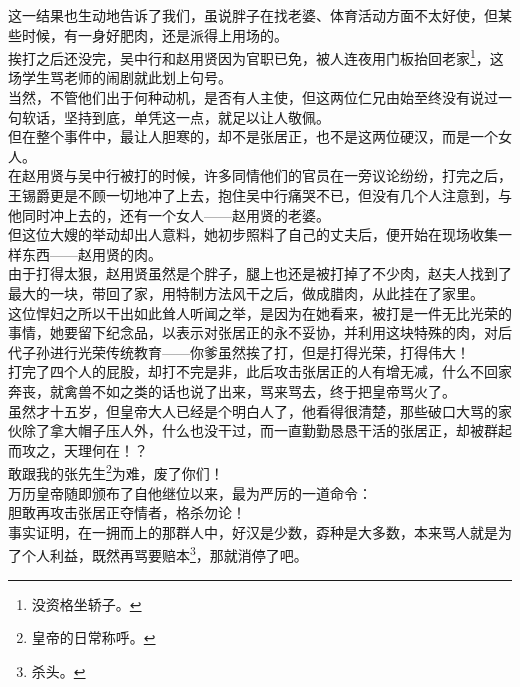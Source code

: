 \begin{multicols}{\theparacolNo}
这一结果也生动地告诉了我们，虽说胖子在找老婆、体育活动方面不太好使，但某些时候，有一身好肥肉，还是派得上用场的。\\

挨打之后还没完，吴中行和赵用贤因为官职已免，被人连夜用门板抬回老家\footnote{没资格坐轿子。}，这场学生骂老师的闹剧就此划上句号。\\

当然，不管他们出于何种动机，是否有人主使，但这两位仁兄由始至终没有说过一句软话，坚持到底，单凭这一点，就足以让人敬佩。\\

但在整个事件中，最让人胆寒的，却不是张居正，也不是这两位硬汉，而是一个女人。\\

在赵用贤与吴中行被打的时候，许多同情他们的官员在一旁议论纷纷，打完之后，王锡爵更是不顾一切地冲了上去，抱住吴中行痛哭不已，但没有几个人注意到，与他同时冲上去的，还有一个女人——赵用贤的老婆。\\

但这位大嫂的举动却出人意料，她初步照料了自己的丈夫后，便开始在现场收集一样东西——赵用贤的肉。\\

由于打得太狠，赵用贤虽然是个胖子，腿上也还是被打掉了不少肉，赵夫人找到了最大的一块，带回了家，用特制方法风干之后，做成腊肉，从此挂在了家里。\\

这位悍妇之所以干出如此耸人听闻之举，是因为在她看来，被打是一件无比光荣的事情，她要留下纪念品，以表示对张居正的永不妥协，并利用这块特殊的肉，对后代子孙进行光荣传统教育——你爹虽然挨了打，但是打得光荣，打得伟大！\\

打完了四个人的屁股，却打不完是非，此后攻击张居正的人有增无减，什么不回家奔丧，就禽兽不如之类的话也说了出来，骂来骂去，终于把皇帝骂火了。\\

虽然才十五岁，但皇帝大人已经是个明白人了，他看得很清楚，那些破口大骂的家伙除了拿大帽子压人外，什么也没干过，而一直勤勤恳恳干活的张居正，却被群起而攻之，天理何在！？\\

敢跟我的张先生\footnote{皇帝的日常称呼。}为难，废了你们！\\

万历皇帝随即颁布了自他继位以来，最为严厉的一道命令：\\

胆敢再攻击张居正夺情者，格杀勿论！\\

事实证明，在一拥而上的那群人中，好汉是少数，孬种是大多数，本来骂人就是为了个人利益，既然再骂要赔本\footnote{杀头。}，那就消停了吧。\\


\end{multicols}
